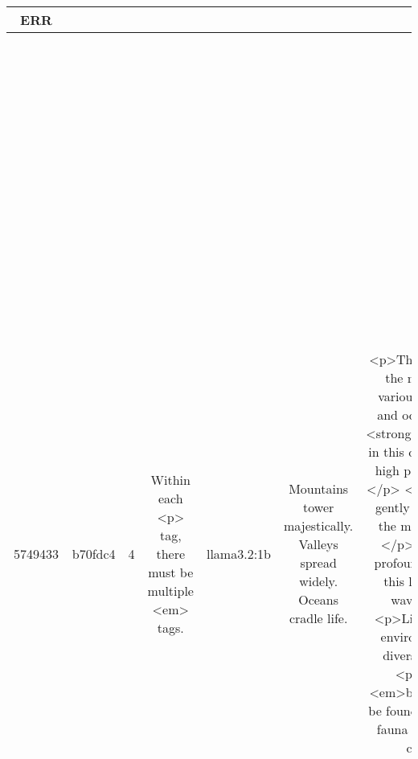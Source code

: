 \begin{table}[h!]
\begin{tabular}{|c|c|c|c|c|c|c|c|c|c|}
ERR & \\
\hline
5749433 & b70fdc4 & 4 & Within each <p> tag, there must be multiple <em> tags. & llama3.2:1b & Mountains tower majestically. Valleys spread widely. Oceans cradle life. & <p>This paragraph describes the natural landscape of various mountains, valleys, and oceans.</p>
<p>The <strong>mountains</strong> in this context are likely to be high peaks or rounded hills.</p>
<p>Valleys are areas of gently sloping land between the mountains and oceans.</p>
<p>Oceans have a profound impact on shaping this landscape with their waves and tides.</p>
<p>Life is thriving in these environments due to their diverse ecosystems.</p>
<p>A wide range of <em>biodiversity</em> can be found, from unique flora to fauna adapted to the harsh conditions.</p> & err & The chatbot output contains six <p> tags, which meets the requirement of having at least three <p> tags. Additionally, it includes the use of one <strong> tag in the second sentence for emphasizing the word "mountains". The output also contains one <em> tag present in the sixth sentence to emphasize the word "biodiversity". However, the description states that each <p> tag should include at least one <strong> tag and multiple <em> tags to emphasize key words and phrases. Since not all sentences have both a <strong> tag and multiple <em> tags, the provided output does not fully comply with the description.

ERR & \\
\hline
a2abb33 & b70fdc4 & 4 & Within each <p> tag, there must be multiple <em> tags. & llama3.2:1b & The storm rages fiercely. Lightning strikes suddenly. Thunder rolls ominously. & <span><p>The storm rages fiercely. ***Lightning*** strikes suddenly.</p></span>
<span><p>Thunder <strong>rolls</strong> ominously.</p></span>
<span><p>The storm rages fiercely. ***lightning*** <em>strikes</em> <strong>suddenly.</strong> </p></span>
<span><p>Thunder <em>rolls</em> ominously.</p></span> & err & The output does not follow the requirements specified in the chatbot description. According to the description, each sentence should be wrapped in a <p> tag, and there should be at least three <p> tags overall. The output provided, however, includes four <p> tags, which indicates a possible repeated sentence or paragraph. Additionally, there is an inappropriate usage of the <span> tag that is not mentioned in the description provided. Furthermore, the <strong> and <em> tags must be used inside each <p> tag, but there are instances where text decorations like *** are used instead, which deviates from the description's specific need for HTML tags. Therefore, owing to these violations, the output does not comply with the description.


\end{tabular}
\end{table}

